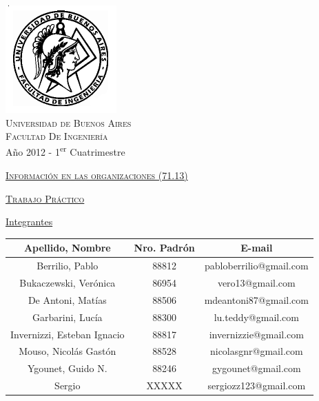 \documentclass[12pt,titlepage]{report}
\begin{document}
\begin{titlepage}

\thispagestyle{empty}

\begin{center}
\includegraphics[scale=0.55]{./Images/fiuba}\\
\large{\textsc{Universidad de Buenos Aires}}\\
\large{\textsc{Facultad De Ingeniería}}\\
\small{Año 2012 - 1\textsuperscript{er} Cuatrimestre}
\end{center}

\vfill

\begin{center}

\Large{\underline{\textsc{Información en las organizaciones (71.13)}}}

\vfill


\Large{\underline{\textsc{Trabajo Práctico}}}

\vfill

\Large\underline{Integrantes} \linebreak\linebreak

\large\addtolength{\tabcolsep}{-3pt}
\begin{tabular}{|| c | c | c ||}
\hline
\textbf{Apellido, Nombre} & \textbf{Nro. Padrón} & \textbf{E-mail} \\
\hline
Berrilio, Pablo & 88812 & pabloberrilio@gmail.com \\
\hline
Bukaczewski, Verónica & 86954 & vero13@gmail.com \\
\hline
De Antoni, Matías & 88506 & mdeantoni87@gmail.com \\
\hline
Garbarini, Lucía & 88300 & lu.teddy@gmail.com\\
\hline
Invernizzi, Esteban Ignacio & 88817 & invernizzie@gmail.com\\
\hline
Mouso, Nicolás Gastón & 88528 & nicolasgnr@gmail.com \\
\hline
Ygounet, Guido N. & 88246 & gygounet@gmail.com \\
\hline
Sergio & XXXXX & sergiozz123@gmail.com \\
\hline
\end{tabular}
\end{center}


\end{titlepage}
\end{document}
